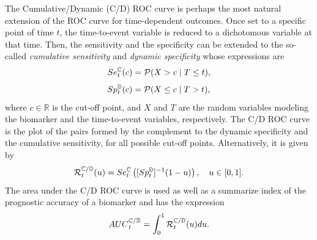 The Cumulative/Dynamic (C/D) ROC curve \citep{Heagerty2000} is perhaps the most natural extension of the ROC curve for time-dependent outcomes. Once set to a specific point of time $t$, the time-to-event variable is reduced to a dichotomous variable at that time. Then, the sensitivity and the specificity can be extended to the so-called {\it {cumulative sensitivity }} and {\it{dynamic specificity}} whose expressions are 
\begin{equation*}
Se_{t}^{\mathbb{C}}(c) = {\cal{P}}(X > c \;| \; T \leq t),
\end{equation*}
\begin{equation*}
Sp_{t}^{\mathbb{D}}(c) = {\cal{P}}(X \leq c \;| \; T > t),
\end{equation*}
where $c \in \mathbb{R}$ is the cut-off point, and $X$ and $T$ are the random variables modeling the biomarker and the time-to-event variables, respectively. The C/D ROC curve is the plot of the pairs formed by the complement to the dynamic specificity and the cumulative sensitivity, for all possible cut-off points. Alternatively, it is given by
\begin{equation*}
{\cal R}_{t}^{{\mathbb{C}}/{\mathbb{D}}}(u)= Se_{t}^{\mathbb{C}}\left([Sp_{t}^{\mathbb{D}}]^{-1}(1-u)\right), \quad u \in[0,1].	
\end{equation*}
The area under the C/D ROC curve is used as well as a summarize index of the prognostic accuracy of a biomarker and has the expression
\begin{equation*}
{AUC}_{t}^{\mathbb{C}/\mathbb{D}} = \int_{0}^{1}{{\cal R}_{t}^{{\mathbb{C}}/{\mathbb{D}}}(u)du}.
\end{equation*}

